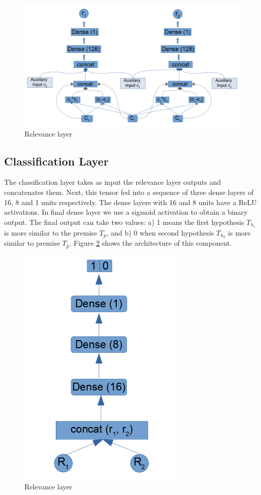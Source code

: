\documentclass[12pt]{report}
\begin{document}
\begin{figure}[H]	
	\centering
	\includegraphics[width=150mm, scale = 1]{images/14_relevance.png}	
	\caption{Relevance layer}	
	\label{figure:relevance}
\end{figure}

\subsection{Classification Layer}

The classification layer takes as input the relevance layer outputs and concatenates them. Next, this tensor fed into  a sequence of three dense layers of 16, 8 and 1 units respectively. The dense layers with 16 and 8 units have a \ac{ReLU} activations. In final dense layer we use a sigmoid activation to obtain a binary output. The final output can take two values: a) 1 means the first hypothesis $T_{h_1}$ is more similar to the premise $T_p$, and b) 0 when second hypothesis 
$T_{h_2}$ is more similar to premise $T_p$. Figure \ref{figure:classification} shows the architecture of this component.

\begin{figure}[H]	
	\centering
	\includegraphics[width=80mm, scale = 1]{images/15_classification.png}	
	\caption{Relevance layer}	
	\label{figure:classification}
\end{figure}
\end{document}
